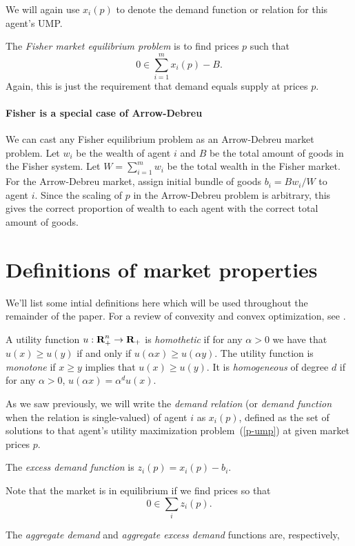\documentclass[12pt]{article}
\begin{document}
We will again use $x_i(p)$ to denote the demand function or relation for
this agent's UMP.

The \emph{Fisher market equilibrium problem} is to find prices $p$ such that
\[
0 \in \sum_{i=1}^m x_{i}(p) - B.
\]
Again, this is just the requirement that demand equals supply
at prices $p$.

\paragraph{Fisher is a special case of Arrow-Debreu}
We can cast any Fisher equilibrium problem as an Arrow-Debreu market problem.
Let $w_i$ be the wealth of agent $i$ and  $B$ be the total amount of goods in
the Fisher system.
Let $W = \sum_{i=1}^m w_i$ be the total wealth in the Fisher market.
For the Arrow-Debreu market, assign initial bundle of goods
$b_i = B w_i/W$ to agent $i$.
Since the scaling of $p$ in the Arrow-Debreu problem is arbitrary,
this gives the correct proportion of wealth to each agent with the correct
total amount of goods.


\section{Definitions of market properties}
We'll list some intial definitions here which will be used throughout the remainder of the paper.
For a review of convexity and convex optimization, see
\cite{boyd2009convex}.

A utility function $u: {\mbox{\bf R}}^n_+ \to {\mbox{\bf R}}_+$ is \emph{homothetic} if for any $\alpha > 0$ we have that $u(x) \geq u(y)$ if and only if
$u(\alpha x) \geq u(\alpha y)$.
The utility function is \emph{monotone} if $x \geq y$ implies that $u(x) \geq u(y)$.
It is \emph{homogeneous} of degree $d$ if for any $\alpha > 0$,
$u(\alpha x) = \alpha^d u(x)$.

As we saw previously, we will write the \emph{demand relation}
(or \emph{demand function}
when the relation is single-valued) of agent $i$ as $x_i(p)$,
defined as the set of solutions to that agent's
utility maximization problem~(\ref{p-ump}) at given market prices $p$.

The \emph{excess demand function} is $z_i(p) = x_i(p) - b_i$.

Note that the market is in equilibrium if we find prices so that
\[
0 \in \sum_i z_i(p).
\]

The \emph{aggregate demand} and \emph{aggregate excess demand} functions are,
respectively,
\end{document}
